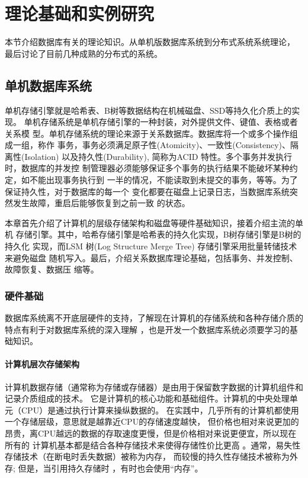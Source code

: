 
\chapter{理论基础和实例研究}
本节介绍数据库有关的理论知识。从单机版数据库系统到分布式系统系统理论，
最后讨论了目前几种成熟的分布式的系统。
\section{单机数据库系统}
单机存储引擎就是哈希表、B树等数据结构在机械磁盘、SSD等持久化介质上的实现。
单机存储系统是单机存储引擎的一种封装，对外提供文件、键值、表格或者关系模
型。单机存储系统的理论来源于关系数据库。数据库将一个或多个操作组成一组，称作
事务，事务必须满足原子性(Atomicity)、一致性(Consistency)、隔离性(Isolation)
以及持久性(Durability), 简称为ACID 特性。多个事务并发执行时，数据库的并发控
制管理器必须能够保证多个事务的执行结果不能破坏某种约定，如不能出现事务执行到
一半的情况，不能读取到未提交的事务，等等。为了保证持久性，对于数据库的每一个
变化都要在磁盘上记录日志，当数据库系统突然发生故障，重启后能够恢复到之前一致
的状态。

本章首先介绍了计算机的层级存储架构和磁盘等硬件基础知识，接着介绍主流的单机
存储引擎。其中，哈希存储引擎是哈希表的持久化实现，B树存储引擎是B树的持久化
实现，而LSM 树(Log Structure Merge Tree) 存储引擎采用批量转储技术来避免磁盘
随机写入。最后，介绍关系数据库理论基础，包括事务、并发控制、故障恢复、数据压
缩等。
\subsection{硬件基础}
数据库系统离不开底层硬件的支持，了解现在计算机的存储系统和各种存储介质的特点有利于对数据库系统的深入理解
，也是开发一个数据库系统必须要学习的基础知识。
\subsubsection{计算机层次存储架构}
计算机数据存储（通常称为存储或存储器）是由用于保留数字数据的计算机组件和记录介质组成的技术。
它是计算机的核心功能和基础组件。计算机的中央处理单元（CPU）是通过执行计算来操纵数据的。
在实践中，几乎所有的计算机都使用一个存储层级，意思就是越靠近CPU的存储速度越快，
但价格也相对来说更加的昂贵，离CPU越远的数据的存取速度更慢，但是价格相对来说更便宜，所以现在所有的
计算机基本都是结合各种存储技术来使得存储性价比更高
。通常，易失性存储技术（在断电时丢失数据）被称为内存，
而较慢的持久性存储技术被称为外存; 但是，当引用持久存储时
，有时也会使用“内存”。

